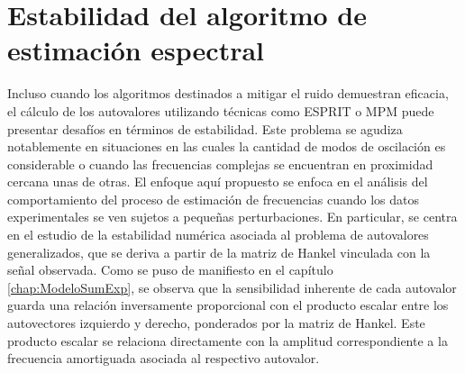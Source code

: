 
\chapter{Estabilidad del algoritmo de estimación espectral} 
\label{chap:EstabilidadNumerica}

    
	Incluso cuando los algoritmos destinados a mitigar el ruido demuestran eficacia, el cálculo de los autovalores utilizando técnicas como ESPRIT o MPM  puede presentar desafíos en términos de estabilidad. Este problema se agudiza notablemente en situaciones en las cuales la cantidad de modos de oscilación es considerable o cuando las frecuencias complejas se encuentran en proximidad cercana unas de otras. El enfoque aquí propuesto se enfoca en el análisis del comportamiento del proceso de estimación de frecuencias cuando los datos experimentales se ven sujetos a pequeñas perturbaciones. En particular, se centra en el estudio de la estabilidad numérica asociada al problema de autovalores generalizados, que se deriva a partir de la matriz de Hankel vinculada con la señal observada. Como se puso de manifiesto en el capítulo \eqref{chap:ModeloSumExp}, se observa que la sensibilidad inherente de cada autovalor guarda una relación inversamente proporcional con el producto escalar entre los autovectores izquierdo y derecho, ponderados por la matriz de Hankel. Este producto escalar se relaciona directamente con la amplitud correspondiente a la frecuencia amortiguada asociada al respectivo autovalor.

        
 
